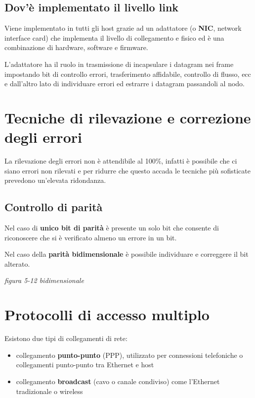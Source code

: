 \documentclass[
]{article}
\begin{document}
\hypertarget{header-n30}{%
\subsection{Dov'è implementato il livello link}\label{header-n30}}

Viene implementato in tutti gli host grazie ad un adattatore (o
\textbf{NIC}, network interface card) che implementa il livello di
collegamento e fisico ed è una combinazione di hardware, software e
firmware.

L'adattatore ha il ruolo in trasmissione di incapsulare i datagram nei
frame impostando bit di controllo errori, trasferimento affidabile,
controllo di flusso, ecc e dall'altro lato di individuare errori ed
estrarre i datagram passandoli al nodo.

\hypertarget{header-n33}{%
\section{Tecniche di rilevazione e correzione degli
errori}\label{header-n33}}

La rilevazione degli errori non è attendibile al 100\%, infatti è
possibile che ci siano errori non rilevati e per ridurre che questo
accada le tecniche più sofisticate prevedono un'elevata ridondanza.

\hypertarget{header-n35}{%
\subsection{Controllo di parità}\label{header-n35}}

Nel caso di \textbf{unico bit di parità} è presente un solo bit che
consente di riconoscere che si è verificato almeno un errore in un bit.

Nel caso della \textbf{parità bidimensionale} è possibile individuare e
correggere il bit alterato.

\emph{figura 5-12 bidimensionale}

\hypertarget{header-n39}{%
\section{Protocolli di accesso multiplo}\label{header-n39}}

Esistono due tipi di collegamenti di rete:

\begin{itemize}
\item
  collegamento \textbf{punto-punto} (PPP), utilizzato per connessioni
  telefoniche o collegamenti punto-punto tra Ethernet e host
\item
  collegamento \textbf{broadcast} (cavo o canale condiviso) come
  l'Ethernet tradizionale o wireless
\end{itemize}
\end{document}
